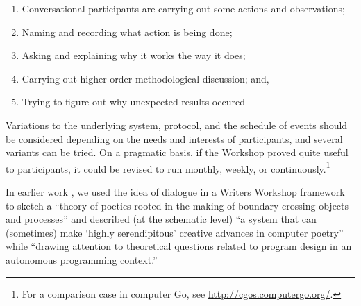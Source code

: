 \begin{center}
\begin{fminipage}{.8\columnwidth}
\begin{minipage}{1\textwidth}
\begin{enumerate}[itemsep=0pt,rightmargin=10pt]
\item Conversational participants are carrying
out some actions and observations;
\item Naming and recording what action is being done;
\item Asking and explaining why it works the way
it does;
\item Carrying out higher-order methodological discussion; and, 
\item Trying to figure out why unexpected results occured
\end{enumerate}
\end{minipage}
\end{fminipage}
\end{center}

Variations to the underlying system, protocol, and the schedule of
events should be considered depending on the needs and interests of
participants, and several variants can be tried.  On a pragmatic
basis, if the Workshop proved quite useful to participants, it could
be revised to run monthly, weekly, or continuously.\footnote{For a
  comparison case in computer Go, see
  \url{http://cgos.computergo.org/}.}


In earlier work \cite{corneli15iccc,corneli15cc}, we used the idea of
dialogue in a Writers Workshop framework to sketch a ``theory of
poetics rooted in the making of boundary-crossing objects and
processes'' and described (at the schematic level) ``a system that can
(sometimes) make `highly serendipitous' creative advances in computer
poetry'' while ``drawing attention to theoretical questions related to
program design in an autonomous programming context.''




